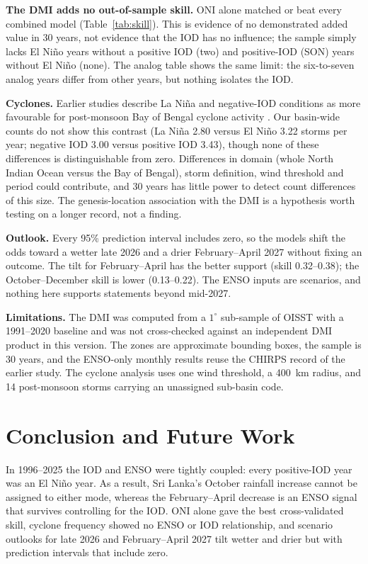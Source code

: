 \documentclass{article}
\begin{document}
\textbf{The DMI adds no out-of-sample skill.} ONI alone matched or beat every combined model
(Table~\ref{tab:skill}). This is evidence of no demonstrated added value in 30 years, not
evidence that the IOD has no influence; the sample simply lacks El Ni\~{n}o years without a
positive IOD (two) and positive-IOD (SON) years without El Ni\~{n}o (none). The analog table shows the
same limit: the six-to-seven analog years differ from other years, but nothing isolates the IOD.

\textbf{Cyclones.} Earlier studies describe La Ni\~{n}a and negative-IOD conditions as more
favourable for post-monsoon Bay of Bengal cyclone activity \cite{girishkumar2012,mahala2015}. Our
basin-wide counts do not show this contrast (La Ni\~{n}a 2.80 versus El Ni\~{n}o 3.22 storms per
year; negative IOD 3.00 versus positive IOD 3.43), though none of these differences is
distinguishable from zero. Differences in domain (whole North Indian Ocean versus the Bay of Bengal),
storm definition, wind threshold and period could contribute, and 30 years has little power to
detect count differences of this size. The genesis-location association with the DMI is a
hypothesis worth testing on a longer record, not a finding.

\textbf{Outlook.} Every 95\% prediction interval includes zero, so the models shift the odds toward a
wetter late 2026 and a drier February--April 2027 without fixing an outcome. The tilt for
February--April has the better support (skill 0.32--0.38); the October--December skill is lower
(0.13--0.22). The ENSO inputs are scenarios, and nothing here supports statements beyond mid-2027.

\textbf{Limitations.} The DMI was computed from a $1^{\circ}$ sub-sample of OISST with a 1991--2020
baseline and was not cross-checked against an independent DMI product in this version. The zones are
approximate bounding boxes, the sample is 30 years, and the ENSO-only monthly results reuse the CHIRPS
record of the earlier study. The cyclone analysis uses one wind threshold, a 400~km radius, and
14 post-monsoon storms carrying an unassigned sub-basin code.

\section{Conclusion and Future Work}

In 1996--2025 the IOD and ENSO were tightly coupled: every positive-IOD year was an El Ni\~{n}o year.
As a result, Sri Lanka's October rainfall increase cannot be assigned to either mode, whereas the
February--April decrease is an ENSO signal that survives controlling for the IOD. ONI alone gave the
best cross-validated skill, cyclone frequency showed no ENSO or IOD relationship, and scenario
outlooks for late 2026 and February--April 2027 tilt wetter and drier but with prediction intervals
that include zero.
\end{document}
